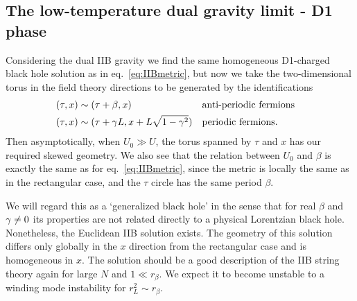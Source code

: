 \subsection{The low-temperature dual gravity limit - D1 phase}
Considering the dual IIB gravity we find the same homogeneous D1-charged black hole solution as in eq.~\eqref{eq:IIBmetric}, but now we take the two-dimensional torus in the field theory directions to be generated by the identifications
\begin{align}
  \label{eq:IIBident}
  (\tau, x) & \sim (\tau + \beta, x)                     & & \text{anti-periodic fermions} \cr
  (\tau, x) & \sim (\tau + \gamma L, x + L\sqrt{1 - \gamma^2}) & & \text{periodic fermions.}
\end{align}
Then asymptotically, when $U_0 \gg U$, the torus spanned by $\tau$ and $x$ has our required skewed geometry.
We also see that the relation between $U_0$ and $\beta$ is exactly the same as for eq.~\eqref{eq:IIBmetric}, since the metric is locally the same as in the rectangular case, and the $\tau$ circle has the same period $\beta$.

We will regard this as a `generalized black hole' in the sense that for real $\beta$ and $\gamma \ne 0$ its properties are not related directly to a physical Lorentzian black hole.
Nonetheless, the Euclidean IIB solution exists.
The geometry of this solution differs only globally in the $x$ direction from the rectangular case and is homogeneous in $x$.
The solution should be a good description of the IIB string theory again for large $N$ and $1 \ll r_{\beta}$.
We expect it to become unstable to a winding mode instability for $r_L^2 \sim r_{\beta}$.

